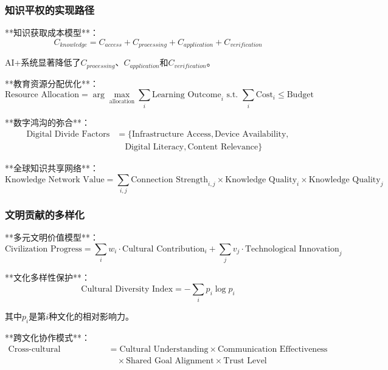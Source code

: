 \subsubsection{知识平权的实现路径} %

**知识获取成本模型**：
\begin{equation}
C_{knowledge} = C_{access} + C_{processing} + C_{application} + C_{verification}
\end{equation}

AI+系统显著降低了$C_{processing}$、$C_{application}$和$C_{verification}$。

**教育资源分配优化**：
\begin{equation}
\text{Resource Allocation} = \arg\max_{\text{allocation}} \sum_{i} \text{Learning Outcome}_i \text{ s.t. } \sum_{i} \text{Cost}_i \leq \text{Budget}
\end{equation}

**数字鸿沟的弥合**：
\begin{align}
\text{Digital Divide Factors} &= \{\text{Infrastructure Access}, \text{Device Availability}, \\
&\quad \text{Digital Literacy}, \text{Content Relevance}\}
\end{align}

**全球知识共享网络**：
\begin{equation}
\text{Knowledge Network Value} = \sum_{i,j} \text{Connection Strength}_{i,j} \times \text{Knowledge Quality}_i \times \text{Knowledge Quality}_j
\end{equation}

\subsubsection{文明贡献的多样化} %

**多元文明价值模型**：
\begin{equation}
\text{Civilization Progress} = \sum_{i} w_i \cdot \text{Cultural Contribution}_i + \sum_{j} v_j \cdot \text{Technological Innovation}_j
\end{equation}

**文化多样性保护**：
\begin{equation}
\text{Cultural Diversity Index} = -\sum_{i} p_i \log p_i
\end{equation}

其中$p_i$是第$i$种文化的相对影响力。

**跨文化协作模式**：
\begin{align}
\text{Cross-cultural Collaboration} &= \text{Cultural Understanding} \times \text{Communication Effectiveness} \\
&\quad \times \text{Shared Goal Alignment} \times \text{Trust Level}
\end{align}


